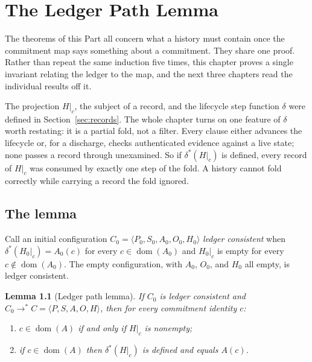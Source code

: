 \documentclass[11pt,openany]{book}
\newtheorem{lemma}[theorem]{Lemma}
\theoremstyle{remark}
\newcommand{\dom}{\operatorname{dom}}
\begin{document}
\chapter{The Ledger Path Lemma}
\label{ch:path}

The theorems of this Part all concern what a history must contain once
the commitment map says something about a commitment. They share one
proof. Rather than repeat the same induction five times, this chapter
proves a single invariant relating the ledger to the map, and the next
three chapters read the individual results off it.

The projection $H|_c$, the subject of a record, and the lifecycle step
function $\delta$ were defined in Section~\ref{sec:records}. The whole
chapter turns on one feature of $\delta$ worth restating: it is a partial
fold, not a filter. Every clause either advances the lifecycle or, for a
discharge, checks authenticated evidence against a live state; none
passes a record through unexamined. So if $\delta^{*}(H|_c)$ is defined,
every record of $H|_c$ was consumed by exactly one step of the fold. A
history cannot fold correctly while carrying a record the fold ignored.

\section{The lemma}

Call an initial configuration $C_0=\langle P_0,S_0,A_0,O_0,H_0\rangle$
\emph{ledger consistent} when $\delta^{*}(H_0|_c)=A_0(c)$ for every
$c\in\dom(A_0)$ and $H_0|_c$ is empty for every $c\notin\dom(A_0)$. The
empty configuration, with $A_0$, $O_0$, and $H_0$ all empty, is ledger
consistent.

\begin{lemma}[Ledger path lemma]\label{lem:path}
If $C_0$ is ledger consistent and $C_0\to^{*}C=\langle P,S,A,O,H\rangle$,
then for every commitment identity $c$:
\begin{enumerate}[label=(\roman*)]
\item $c\in\dom(A)$ if and only if $H|_c$ is nonempty;
\item if $c\in\dom(A)$ then $\delta^{*}(H|_c)$ is defined and equals
$A(c)$.
\end{enumerate}
\end{lemma}
\end{document}
